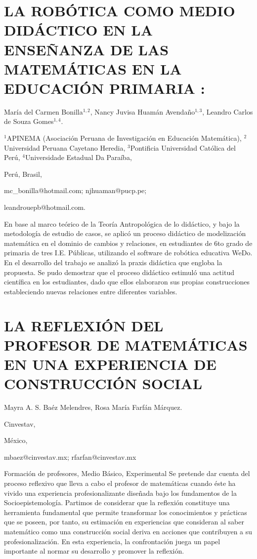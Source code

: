 \section{LA ROBÓTICA COMO MEDIO DIDÁCTICO EN LA ENSEÑANZA DE LAS MATEMÁTICAS
EN LA EDUCACIÓN PRIMARIA :}

\begin{datos}

María del Carmen Bonilla$^{1,2}$, Nancy Juvisa Huamán Avendaño$^{1,3}$,
Leandro Carlos de Souza Gomes$^{1,4}$.

$^{1}$APINEMA (Asociación Peruana de Investigación en Educación Matemática),
$^{2}$Universidad Peruana Cayetano Heredia, $^{3}$Pontificia Universidad
Católica del Perú, $^{4}$Universidade Estadual Da Paraíba,

Perú, Brasil, 

mc\_bonilla@hotmail.com; njhuaman@pucp.pe;

leandrouepb@hotmail.com. 

\end{datos}

En base al marco teórico de la Teoría Antropológica de lo didáctico,
y bajo la metodología de estudio de casos, se aplicó un proceso didáctico
de modelización matemática en el dominio de cambios y relaciones,
en estudiantes de 6to grado de primaria de tres I.E. Públicas, utilizando
el software de robótica educativa WeDo. En el desarrollo del trabajo
se analizó la praxis didáctica que engloba la propuesta. Se pudo demostrar
que el proceso didáctico estimuló una actitud científica en los estudiantes,
dado que ellos elaboraron sus propias construcciones estableciendo
nuevas relaciones entre diferentes variables.


\section{LA REFLEXIÓN DEL PROFESOR DE MATEMÁTICAS EN UNA EXPERIENCIA DE CONSTRUCCIÓN
SOCIAL }

\begin{datos}

Mayra A. S. Baéz Melendres, Rosa María Farfán Márquez.

Cinvestav, 

México,

mbaez@cinvestav.mx; rfarfan@cinvestav.mx 

\end{datos}

Formación de profesores, Medio Básico, Experimental Se pretende dar
cuenta del proceso reflexivo que lleva a cabo el profesor de matemáticas
cuando éste ha vivido una experiencia profesionalizante diseñada bajo
los fundamentos de la Socioepistemología. Partimos de considerar que
la reflexión constituye una herramienta fundamental que permite transformar
los conocimientos y prácticas que se poseen, por tanto, su estimación
en experiencias que consideran al saber matemático como una construcción
social deriva en acciones que contribuyen a su profesionalización.
En esta experiencia, la confrontación juega un papel importante al
normar su desarrollo y promover la reflexión.


